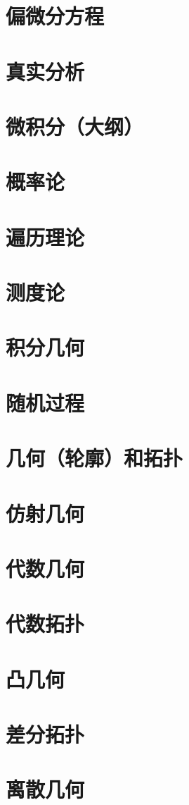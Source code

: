 \section{偏微分方程}
\section{真实分析}
\section{微积分（大纲）}
\section{概率论}
\section{遍历理论}
\section{测度论}
\section{积分几何}
\section{随机过程}
\section{几何（轮廓）和拓扑}
\section{仿射几何}
\section{代数几何}
\section{代数拓扑}
\section{凸几何}
\section{差分拓扑}
\section{离散几何}
